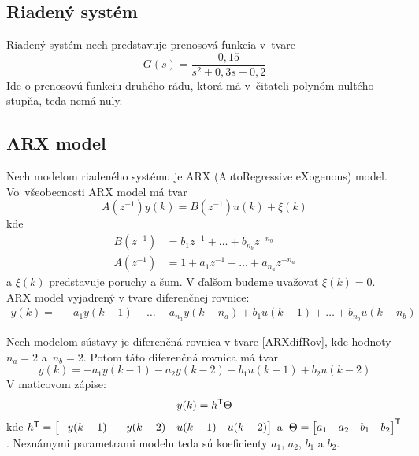 \documentclass[a4paper, 10pt, ]{article}
\begin{document}
\subsection{Riadený systém}

Riadený systém nech predstavuje prenosová funkcia v~tvare
\begin{equation} \label{riadenySys}
	G(s) = \frac{0,15}{s^2 + 0,3s + 0,2}
\end{equation}
Ide o prenosovú funkciu druhého rádu, ktorá má v~čitateli polynóm nultého stupňa, teda nemá nuly.




\subsection{ARX model}

Nech modelom riadeného systému je ARX (AutoRegressive eXogenous) model. Vo~všeobecnosti ARX model má tvar
\begin{equation} \label{ARX}
	A(z^{-1})y(k) = B(z^{-1})u(k) + \xi(k)
\end{equation}
kde
\begin{equation}
	\begin{split}
		 B(z^{-1}) &= b_1z^{-1} + \ldots + b_{n_b}z^{-n_b} \\
		 A(z^{-1}) &= 1 + a_1z^{-1} + \ldots + a_{n_a}z^{-n_a}
	\end{split}
\end{equation}
a $\xi(k)$ predstavuje poruchy a šum. V ďalšom budeme uvažovať $\xi(k) = 0$. ARX model vyjadrený v tvare diferenčnej rovnice:
\begin{equation} \label{ARXdifRov}
	\begin{split}
		y(k) = & -a_1y(k-1) - \ldots - a_{n_a}y(k-n_a) +  b_1u(k-1) + \ldots + b_{n_b}u(k-n_b)
	\end{split}
\end{equation}

Nech modelom sústavy je diferenčná rovnica v tvare \eqref{ARXdifRov}, kde hodnoty $n_a = 2$ a~$n_b = 2$. Potom táto diferenčná rovnica má tvar
\begin{equation} \label{modelDifRov}
	y(k) =  - a_1y(k-1) - a_2y(k-2) + b_1u(k-1) + b_2u(k-2)
\end{equation}
V maticovom zápise:
\begin{equation} \label{modelMatic}
	y(k) = h^{\mathsf{T}} \Theta
\end{equation}
kde $h^{\mathsf{T}} = \begin{bmatrix} -y(k-1) & -y(k-2) & u(k-1) & u(k-2) \end{bmatrix}$  a~$\Theta = \begin{bmatrix} a_1 & a_2 & b_1 & b_2 \end{bmatrix}^{\mathsf{T}}$.
Neznámymi parametrami modelu teda sú koeficienty $a_1$, $a_2$, $b_1$ a $b_2$.
\end{document}
